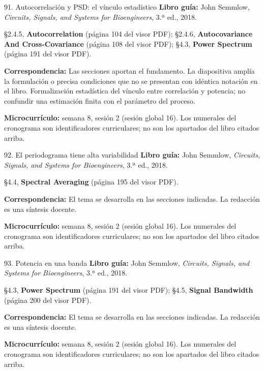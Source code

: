 \documentclass[
  10pt,
  ignorenonframetext,
  aspectratio=169,
  spanish,
]{beamer}
\begin{document}
\begin{frame}{91. Autocorrelación y PSD: el vínculo estadístico}
\label{autocorrelaciuxf3n-y-psd-el-vuxednculo-estaduxedstico}
\textbf{Libro guía:} John Semmlow, \emph{Circuits, Signals, and Systems
for Bioengineers}, 3.ª ed., 2018.

§2.4.5, \textbf{Autocorrelation} (página 104 del visor PDF); §2.4.6,
\textbf{Autocovariance And Cross-Covariance} (página 108 del visor PDF);
§4.3, \textbf{Power Spectrum} (página 191 del visor PDF).

\textbf{Correspondencia:} Las secciones aportan el fundamento. La
diapositiva amplía la formulación o precisa condiciones que no se
presentan con idéntica notación en el libro. Formalización estadística
del vínculo entre correlación y potencia; no confundir una estimación
finita con el parámetro del proceso.

\textbf{Microcurrículo:} semana 8, sesión 2 (sesión global 16). Los
numerales del cronograma son identificadores curriculares; no son los
apartados del libro citados arriba.
\end{frame}

\begin{frame}{92. El periodograma tiene alta variabilidad}
\label{el-periodograma-tiene-alta-variabilidad}
\textbf{Libro guía:} John Semmlow, \emph{Circuits, Signals, and Systems
for Bioengineers}, 3.ª ed., 2018.

§4.4, \textbf{Spectral Averaging} (página 195 del visor PDF).

\textbf{Correspondencia:} El tema se desarrolla en las secciones
indicadas. La redacción es una síntesis docente.

\textbf{Microcurrículo:} semana 8, sesión 2 (sesión global 16). Los
numerales del cronograma son identificadores curriculares; no son los
apartados del libro citados arriba.
\end{frame}

\begin{frame}{93. Potencia en una banda}
\label{potencia-en-una-banda}
\textbf{Libro guía:} John Semmlow, \emph{Circuits, Signals, and Systems
for Bioengineers}, 3.ª ed., 2018.

§4.3, \textbf{Power Spectrum} (página 191 del visor PDF); §4.5,
\textbf{Signal Bandwidth} (página 200 del visor PDF).

\textbf{Correspondencia:} El tema se desarrolla en las secciones
indicadas. La redacción es una síntesis docente.

\textbf{Microcurrículo:} semana 8, sesión 2 (sesión global 16). Los
numerales del cronograma son identificadores curriculares; no son los
apartados del libro citados arriba.
\end{frame}
\end{document}
